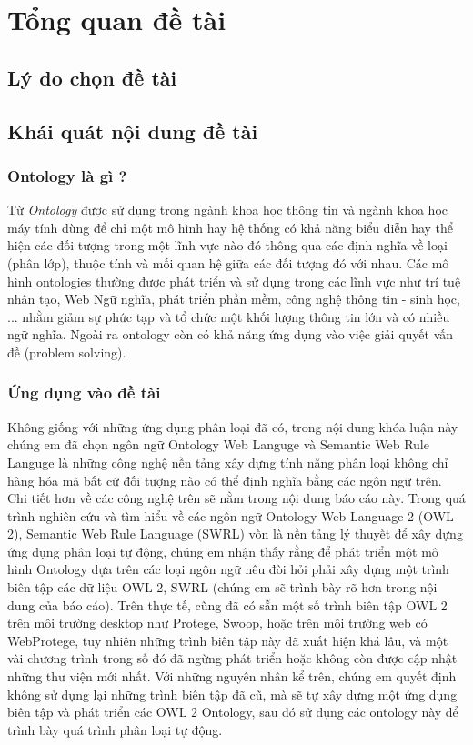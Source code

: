 \chapter{Tổng quan đề tài}
\section{Lý do chọn đề tài}

\section{Khái quát nội dung đề tài}
\subsection{Ontology là gì ?}
Từ \textit{Ontology} được sử dụng trong ngành khoa học thông tin và ngành khoa học máy tính dùng để chỉ một mô hình hay hệ thống có khả năng biểu diễn hay thể hiện các đối tượng trong một lĩnh vực nào đó thông qua các định nghĩa về loại (phân lớp), thuộc tính và mối quan hệ giữa các đối tượng đó với nhau. Các mô hình ontologies thường được phát triển và sử dụng trong các lĩnh vực như trí tuệ nhân tạo, Web Ngữ nghĩa, phát triển phần mềm, công nghệ thông tin - sinh học, ... nhằm giảm sự phức tạp và tổ chức một khối lượng thông tin lớn và có nhiều ngữ nghĩa. Ngoài ra ontology còn có khả năng ứng dụng vào việc giải quyết vấn đề (problem solving).
\subsection{Ứng dụng vào đề tài}
Không giống với những ứng dụng phân loại đã có, trong nội dung khóa luận này chúng em đã chọn ngôn ngữ Ontology Web Languge và Semantic Web Rule Languge là những công nghệ nền tảng xây dựng tính năng phân loại không chỉ hàng hóa mà bất cứ đối tượng nào có thể định nghĩa bằng các ngôn ngữ trên. Chi tiết hơn về các công nghệ trên sẽ nằm trong nội dung báo cáo này. 
Trong quá trình nghiên cứu và tìm hiểu về các ngôn ngữ Ontology Web Language 2 (OWL 2), Semantic Web Rule Language (SWRL) vốn là nền tảng lý thuyết để xây dựng ứng dụng phân loại tự động, chúng em nhận thấy rằng để phát triển một mô hình Ontology dựa trên các loại ngôn ngữ nêu đòi hỏi phải xây dựng một trình biên tập các dữ liệu OWL 2, SWRL (chúng em sẽ trình bày rõ hơn trong nội dung của báo cáo). Trên thực tế, cũng đã có sẵn một số trình biên tập OWL 2 trên môi trường desktop như Protege, Swoop, hoặc trên môi trường web có WebProtege, tuy nhiên những trình biên tập này đã xuất hiện khá lâu, và một vài chương trình trong số đó đã ngừng phát triển hoặc không còn được cập nhật những thư viện mới nhất. Với những nguyên nhân kể trên, chúng em quyết định không sử dụng lại những trình biên tập đã cũ, mà sẽ tự xây dựng một ứng dụng biên tập và phát triển các OWL 2 Ontology, sau đó sử dụng các ontology này để trình bày quá trình phân loại tự động.

